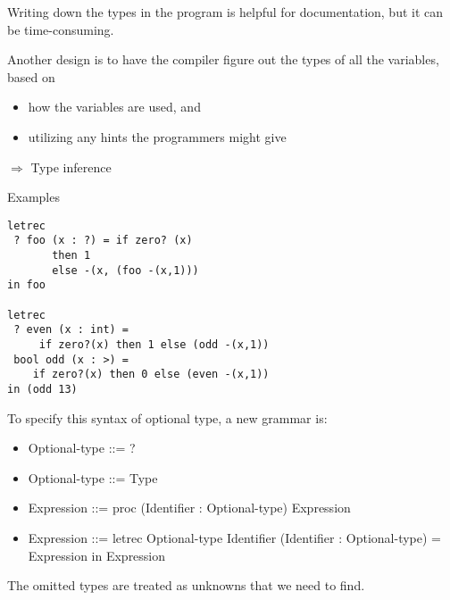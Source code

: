 \documentclass{article}
\begin{document}
\begin{huge}

Writing down the types in the program is helpful for documentation, but it can be time-consuming.

Another design is to have the compiler figure out the types of all the variables, based on
\begin{itemize}
\item how the variables are used, and
\item utilizing any hints the programmers might give
\end{itemize}

$\Rightarrow$ Type inference 


Examples
\begin{lstlisting}
letrec
 ? foo (x : ?) = if zero? (x)
       then 1
       else -(x, (foo -(x,1)))
in foo

letrec
 ? even (x : int) = 
     if zero?(x) then 1 else (odd -(x,1))
 bool odd (x : >) = 
    if zero?(x) then 0 else (even -(x,1))
in (odd 13)
\end{lstlisting}


To specify this syntax of optional type, a new grammar is:
\begin{itemize}
\item Optional-type ::= ? 
\item Optional-type ::= Type 
\item Expression ::= proc (Identifier : Optional-type) Expression \\
\item Expression ::= letrec Optional-type Identifier (Identifier : Optional-type) = Expression in Expression \\
\end{itemize}


The omitted types are treated as unknowns that we need to find. 


\end{huge}
\end{document}
